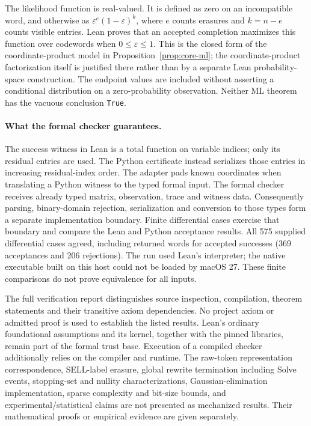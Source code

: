 The likelihood function is real-valued. It is defined as zero on an
incompatible word, and otherwise as
$\varepsilon^{e}(1-\varepsilon)^k$, where $e$ counts erasures and
$k=n-e$ counts visible entries.
Lean proves that an accepted completion maximizes this function over
codewords when $0\leq\varepsilon\leq1$. This is the closed form of the
coordinate-product model in Proposition~\ref{prop:core-ml}; the
coordinate-product factorization itself is justified there rather than
by a separate Lean probability-space construction. The endpoint values
are included without asserting a conditional distribution on a
zero-probability observation. Neither ML theorem has the vacuous
conclusion \texttt{True}.

\paragraph{What the formal checker guarantees.}
The success witness in Lean is a total function on variable indices;
only its residual entries are used. The Python certificate instead
serializes those entries in increasing residual-index order. The
adapter pads known coordinates when translating a Python witness to
the typed formal input. The formal checker receives already typed
matrix, observation, trace and witness data. Consequently parsing,
binary-domain rejection, serialization and conversion to those types
form a separate implementation boundary. Finite differential cases
exercise that boundary and compare the Lean and Python acceptance
results. All 575 supplied differential cases agreed, including returned
words for accepted successes (369 acceptances and 206 rejections). The
run used Lean's interpreter; the native executable built on this host
could not be loaded by macOS 27. These finite comparisons do not prove
equivalence for all inputs.

The full verification report distinguishes source inspection,
compilation, theorem statements and their transitive axiom
dependencies. No project axiom or admitted proof is used to establish
the listed results. Lean's ordinary foundational assumptions and its
kernel, together with the pinned libraries, remain part of the formal
trust base. Execution of a compiled checker additionally relies on the
compiler and runtime. The raw-token representation correspondence,
SELL-label erasure, global rewrite termination including Solve events,
stopping-set and nullity characterizations,
Gaussian-elimination implementation, sparse complexity and bit-size
bounds, and experimental/statistical claims are not presented as
mechanized results. Their mathematical proofs or empirical evidence
are given separately.
